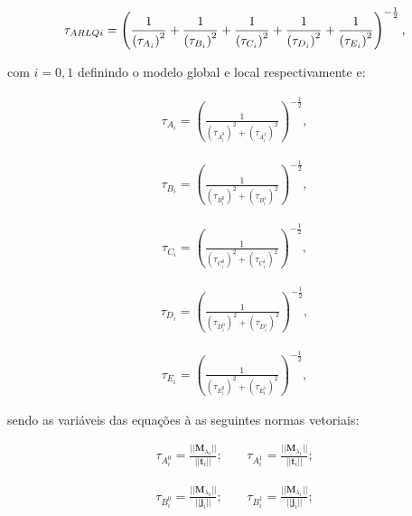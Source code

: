 \documentclass[tese_patricia]{subfiles}
\begin{document}
\begin{align}
	\tau_{ARLQi} = \left(\frac{1}{\left(\tau_{A_i}\right)^{2}} + \frac{1}{\left(\tau_{B_i}\right)^{2}} +  \frac{1}{\left(\tau_{C_i}\right)^{2}} + 
	\frac{1}{\left(\tau_{D_i}\right)^{2}} +
	\frac{1}{\left(\tau_{E_i}\right)^{2}}
	\right)^{-\frac{1}{2}},
\end{align}

\noindent com $i=0,1$ definindo o modelo global e local respectivamente e:

\begin{align}
	\tau_{A_{i}} = \left(\frac{1}{\left(\tau_{A_i^{0}}\right)^{2} + \left(\tau_{A_i^{1}}\right)^{2}} \right)^{-\frac{1}{2}}, \label{eq:tAi}
\end{align}

\begin{align}
	\tau_{B_{i}} = \left(\frac{1}{\left(\tau_{B_i^{0}}\right)^{2} + \left(\tau_{B_i^{1}}\right)^{2}} \right)^{-\frac{1}{2}},
\end{align}

\begin{align}
	\tau_{C_{i}} = \left(\frac{1}{\left(\tau_{C_i^{0}}\right)^{2} + \left(\tau_{C_i^{1}}\right)^{2}} \right)^{-\frac{1}{2}},
\end{align}

\begin{align}
	\tau_{D_{i}} = \left(\frac{1}{\left(\tau_{D_i^{0}}\right)^{2} + \left(\tau_{D_i^{1}}\right)^{2}} \right)^{-\frac{1}{2}},
\end{align}

\begin{align}
	\tau_{E_{i}} = \left(\frac{1}{\left(\tau_{E_i^{0}}\right)^{2} + \left(\tau_{E_i^{1}}\right)^{2}} \right)^{-\frac{1}{2}},\label{eq:tEi}
\end{align}

\noindent sendo as variáveis das equações  à  as seguintes normas vetoriais:

\begin{align}
	\tau_{A_i^{0}} = \frac{|| \mathbf{M}_{\lambda_0} || }{||\mathbf{t}_{i} ||}; \ \ \ \ \  & \tau_{A_i^{1}} = \frac{|| \mathbf{M}_{\lambda_1} || }{||\mathbf{t}_{i} ||};
\end{align}


\begin{align}
	\tau_{B_i^{0}} = \frac{|| \mathbf{M}_{\lambda_0} || }{||\mathbf{j}_{i} ||}; \ \ \ \ \  &  \tau_{B_i^{1}} = \frac{|| \mathbf{M}_{\lambda_1} || }{||\mathbf{j}_{i} ||}; 
\end{align}
\end{document}
